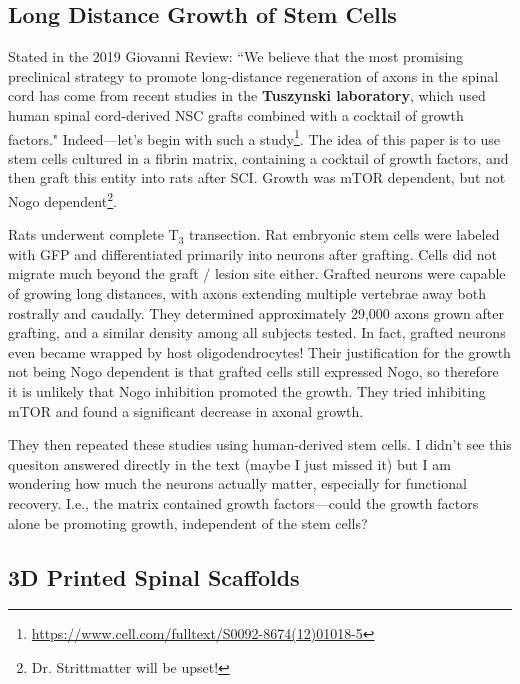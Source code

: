 \documentclass[12pt]{report}
\begin{document}
\subsection{Long Distance Growth of Stem Cells}

Stated in the 2019 Giovanni Review: ``We believe that the most promising preclinical strategy to promote long-distance regeneration of axons in the spinal cord has come from recent studies in the \textbf{Tuszynski laboratory}, which used human spinal cord-derived NSC grafts combined with a cocktail of growth factors." Indeed---let's begin with such a study\footnote{\url{https://www.cell.com/fulltext/S0092-8674(12)01018-5}}. The idea of this paper is to use stem cells cultured in a fibrin matrix, containing a cocktail of growth factors, and then graft this entity into rats after SCI. Growth was mTOR dependent, but not Nogo dependent\footnote{Dr. Strittmatter will be upset!}.\newline

Rats underwent complete T$_3$ transection. Rat embryonic stem cells were labeled with GFP and differentiated primarily into neurons after grafting. Cells did not migrate much beyond the graft / lesion site either. Grafted neurons were capable of growing long distances, with axons extending multiple vertebrae away both rostrally and caudally. They determined approximately 29,000 axons grown after grafting, and a similar density among all subjects tested. In fact, grafted neurons even became wrapped by host oligodendrocytes! Their justification for the growth not being Nogo dependent is that grafted cells still expressed Nogo, so therefore it is unlikely that Nogo inhibition promoted the growth. They tried inhibiting mTOR and found a significant decrease in axonal growth.\newline

They then repeated these studies using human-derived stem cells. I didn't see this quesiton answered directly in the text (maybe I just missed it) but I am wondering how much the neurons actually matter, especially for functional recovery. I.e., the matrix contained growth factors---could the growth factors alone be promoting growth, independent of the stem cells?

\subsection{3D Printed Spinal Scaffolds}
\end{document}
